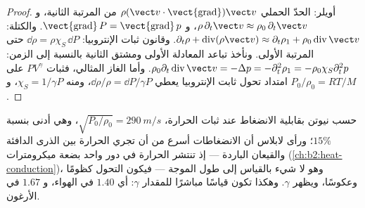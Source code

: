 \begin{proof}
أويلر: الحدّ الحملي $\rho(\vect v\cdot\operatorname{\vect{grad}})\vect v$
من المرتبة الثانية، و $\rho\,\partial_t\vect v \approx \rho_0\,\partial_t\vect v$، و
$\operatorname{\vect{grad}}P = \operatorname{\vect{grad}}p$. والكتلة: $\partial_t\rho +
\operatorname{div}(\rho\vect v) \approx \partial_t\rho_1 + \rho_0\operatorname{div}\vect v$.
وقانون ثبات الإنتروبيا: $\dd\rho = \rho\chi_S\,\dd P$ حتى المرتبة الأولى. ونأخذ
تباعد المعادلة الأولى ومشتق الثانية بالنسبة إلى الزمن:
$\rho_0\partial_t\operatorname{div}\vect v = -\Delta p = -\partial_t^2\rho_1 = -\rho_0\chi_S
\partial_t^2p$. وأما الغاز المثالي، فثبات $PV^\gamma$ على امتداد تحول
ثابت الإنتروبيا يعطي $\dd\rho/\rho = \dd P/\gamma P$، ومنه $\chi_S = 1/\gamma P$،
و $P_0/\rho_0 = RT/M$.
\end{proof}

\begin{remark}\label{rem:b2:sound-waves:laplace}
حسب نيوتن  بقابلية الانضغاط عند ثبات الحرارة،
$\sqrt{P_0/\rho_0} = \qty{290}{m/s}$، وهي أدنى بنسبة $15\%$؛ ورأى لابلاس أن
الانضغاطات أسرع من أن تجري الحرارة بين الذرى الدافئة
والقيعان الباردة --- إذ تنتشر الحرارة في دور واحد بضعة ميكرومترات
(\cref{ch:b2:heat-conduction})، وهو لا شيء بالقياس إلى طول الموجة ---
فيكون التحول كظومًا وعكوسًا، ويظهر $\gamma$.
وهكذا تكون  قياسًا مباشرًا للمقدار $\gamma$: أي $1.40$ في
الهواء، و $1.67$ في الأرغون.
\end{remark}

